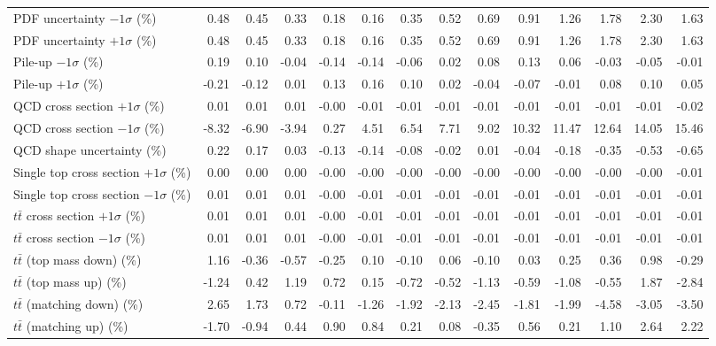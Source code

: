 \begin{table}[htbp]
{\begin{tabular}{lrrrrrrrrrrrrr}
PDF uncertainty $-1\sigma$ (\%) & 0.48 & 0.45 & 0.33 & 0.18 & 0.16 & 0.35 & 0.52 & 0.69 & 0.91 & 1.26 & 1.78 & 2.30 & 1.63 \\ 
PDF uncertainty $+1\sigma$ (\%) & 0.48 & 0.45 & 0.33 & 0.18 & 0.16 & 0.35 & 0.52 & 0.69 & 0.91 & 1.26 & 1.78 & 2.30 & 1.63 \\ 
Pile-up $-1\sigma$ (\%) & 0.19 & 0.10 & -0.04 & -0.14 & -0.14 & -0.06 & 0.02 & 0.08 & 0.13 & 0.06 & -0.03 & -0.05 & -0.01 \\ 
Pile-up $+1\sigma$ (\%) & -0.21 & -0.12 & 0.01 & 0.13 & 0.16 & 0.10 & 0.02 & -0.04 & -0.07 & -0.01 & 0.08 & 0.10 & 0.05 \\ 
QCD cross section \ensuremath{+1\sigma} (\%) & 0.01 & 0.01 & 0.01 & -0.00 & -0.01 & -0.01 & -0.01 & -0.01 & -0.01 & -0.01 & -0.01 & -0.01 & -0.02 \\ 
QCD cross section \ensuremath{-1\sigma} (\%) & -8.32 & -6.90 & -3.94 & 0.27 & 4.51 & 6.54 & 7.71 & 9.02 & 10.32 & 11.47 & 12.64 & 14.05 & 15.46 \\ 
QCD shape uncertainty (\%) & 0.22 & 0.17 & 0.03 & -0.13 & -0.14 & -0.08 & -0.02 & 0.01 & -0.04 & -0.18 & -0.35 & -0.53 & -0.65 \\ 
Single top cross section $+1\sigma$ (\%) & 0.00 & 0.00 & 0.00 & -0.00 & -0.00 & -0.00 & -0.00 & -0.00 & -0.00 & -0.00 & -0.00 & -0.00 & -0.01 \\ 
Single top cross section $-1\sigma$ (\%) & 0.01 & 0.01 & 0.01 & -0.00 & -0.01 & -0.01 & -0.01 & -0.01 & -0.01 & -0.01 & -0.01 & -0.01 & -0.01 \\ 
$t\bar{t}$ cross section $+1\sigma$ (\%) & 0.01 & 0.01 & 0.01 & -0.00 & -0.01 & -0.01 & -0.01 & -0.01 & -0.01 & -0.01 & -0.01 & -0.01 & -0.01 \\ 
$t\bar{t}$ cross section $-1\sigma$ (\%) & 0.01 & 0.01 & 0.01 & -0.00 & -0.01 & -0.01 & -0.01 & -0.01 & -0.01 & -0.01 & -0.01 & -0.01 & -0.01 \\ 
$t\bar{t}$ (top mass down) (\%) & 1.16 & -0.36 & -0.57 & -0.25 & 0.10 & -0.10 & 0.06 & -0.10 & 0.03 & 0.25 & 0.36 & 0.98 & -0.29 \\ 
$t\bar{t}$ (top mass up) (\%) & -1.24 & 0.42 & 1.19 & 0.72 & 0.15 & -0.72 & -0.52 & -1.13 & -0.59 & -1.08 & -0.55 & 1.87 & -2.84 \\ 
$t\bar{t}$ (matching down) (\%) & 2.65 & 1.73 & 0.72 & -0.11 & -1.26 & -1.92 & -2.13 & -2.45 & -1.81 & -1.99 & -4.58 & -3.05 & -3.50 \\ 
$t\bar{t}$ (matching up) (\%) & -1.70 & -0.94 & 0.44 & 0.90 & 0.84 & 0.21 & 0.08 & -0.35 & 0.56 & 0.21 & 1.10 & 2.64 & 2.22 \\ 

\end{tabular}}
\end{table}
